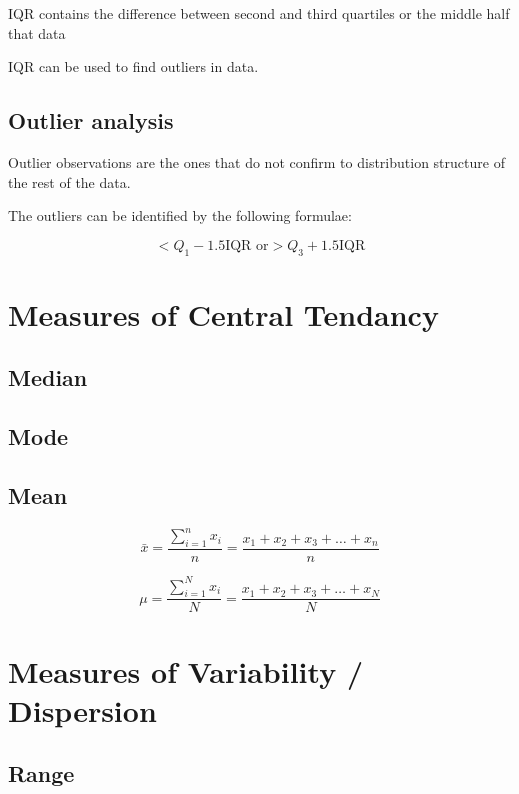 \documentclass[12pt,a4paper]{article}
\begin{document}
IQR contains the {difference between} second and third quartiles  or the middle half that data

IQR can be used to find outliers in data.

\subsection{Outlier analysis}
Outlier observations are the ones that do not confirm to distribution structure of the rest of the data.

The outliers can be identified by the following formulae:

\begin{equation}
    < Q_1 - 1.5\text{IQR or} > Q_3 + 1.5\text{IQR}
\end{equation}

\section{Measures of Central Tendancy}

\subsection{Median}
\subsection{Mode}
\subsection{Mean}

\begin{equation}
    \bar{x} = \frac{\sum_{i = 1}^{n} x_i}{n}= \frac{x_1 + x_2 + x_3 + \ldots + x_n}{n}
\end{equation}

\begin{equation}
    \mu = \frac{\sum_{i = 1}^{N} x_i}{N}= \frac{x_1 + x_2 + x_3 + \ldots + x_N}{N}
\end{equation}


\section{Measures of Variability / Dispersion}

\subsection{Range}
\end{document}

